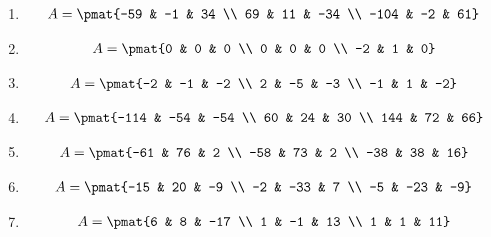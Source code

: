 \begin{enumerate}
\item

\begin{align*}
A = \pmat{-59 & -1 & 34 \\ 69 & 11 & -34 \\ -104 & -2 & 61}
\end{align*}

\item

\begin{align*}
A = \pmat{0 & 0 & 0 \\ 0 & 0 & 0 \\ -2 & 1 & 0}
\end{align*}

\item

\begin{align*}
A = \pmat{-2 & -1 & -2 \\ 2 & -5 & -3 \\ -1 & 1 & -2}
\end{align*}

\item

\begin{align*}
A = \pmat{-114 & -54 & -54 \\ 60 & 24 & 30 \\ 144 & 72 & 66}
\end{align*}

\item

\begin{align*}
A = \pmat{-61 & 76 & 2 \\ -58 & 73 & 2 \\ -38 & 38 & 16}
\end{align*}

\item

\begin{align*}
A = \pmat{-15 & 20 & -9 \\ -2 & -33 & 7 \\ -5 & -23 & -9}
\end{align*}

\item

\begin{align*}
A = \pmat{6 & 8 & -17 \\ 1 & -1 & 13 \\ 1 & 1 & 11}
\end{align*}


\end{enumerate}
